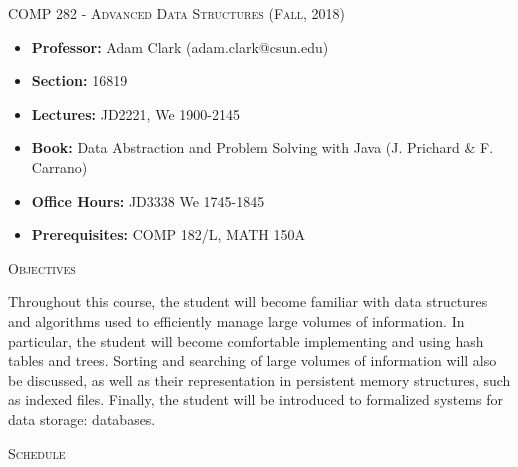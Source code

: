 \documentclass{letter}
\newcommand{\heading}[1]{{\large \textsc{#1}}}
\begin{document}
\heading{COMP 282 - Advanced Data Structures (Fall, 2018)}

\begin{itemize}
  \item[] {\bf Professor:} Adam Clark (adam.clark@csun.edu)
  \item[] {\bf Section:} 16819
  \item[] {\bf Lectures:} JD2221, We 1900-2145
  \item[] {\bf Book:} Data Abstraction and Problem Solving with Java
    (J. Prichard \& F. Carrano)
  \item[] {\bf Office Hours:} JD3338 We 1745-1845
  \item[] {\bf Prerequisites:} COMP 182/L, MATH 150A
\end{itemize}

\heading{Objectives}

Throughout this course, the student will become familiar with data structures
and algorithms used to efficiently manage large volumes of information.  In
particular, the student will become comfortable implementing and using hash
tables and trees.  Sorting and searching of large volumes of information will
also be discussed, as well as their representation in persistent memory
structures, such as indexed files.  Finally, the student will be introduced to
formalized systems for data storage: databases.

\heading{Schedule}
\end{document}
